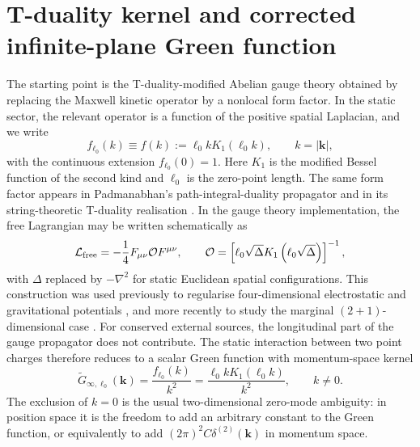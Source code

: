 \documentclass[openacc]{rsproca_new}%
\begin{document}
\section{T-duality kernel and corrected infinite-plane Green function}

The starting point is the T-duality-modified Abelian gauge theory obtained by replacing the Maxwell kinetic operator by a nonlocal form factor. In the static sector, the relevant operator is a function of the positive spatial Laplacian, and we write
\begin{equation}
  f_{\ell_0}(k)\equiv f(k):=\ell_0 k K_1(\ell_0 k),
  \qquad k=|\mathbf k|,
\end{equation}
with the continuous extension $f_{\ell_0}(0)=1$. Here $K_1$ is the modified Bessel function of the second kind and $\ell_0$ is the zero-point length. The same form factor appears in Padmanabhan's path-integral-duality propagator and in its string-theoretic T-duality realisation \cite{Padmanabhan1997, SmailagicSpallucciPadmanabhan2003, FontaniniSpallucciPadmanabhan2006}. In the gauge theory implementation, the free Lagrangian may be written schematically as
\begin{equation}
  \mathcal L_{\rm free}=-\frac{1}{4} F_{\mu\nu}\mathcal O F^{\mu\nu},\qquad
  \mathcal O=\left[\ell_0\sqrt{\Delta} K_1\left(\ell_0\sqrt{\Delta}\right)\right]^{-1},
\end{equation}
with $\Delta$ replaced by $-\nabla^2$ for static Euclidean spatial configurations. This construction was used previously to regularise four-dimensional electrostatic and gravitational potentials \cite{NicoliniSpallucciWondrak2019, GaeteNicolini2022}, and more recently to study the marginal $(2+1)$-dimensional case \cite{GaeteNicolini2026}. For conserved external sources, the longitudinal part of the gauge propagator does not contribute. The static interaction between two point charges therefore reduces to a scalar Green function with momentum-space kernel
\begin{equation}
  \widetilde G_{\infty,\ell_0}(\mathbf k)
  =\frac{f_{\ell_0}(k)}{k^2}
  =\frac{\ell_0 k K_1(\ell_0 k)}{k^2},
  \qquad k\neq 0.
\end{equation}
The exclusion of $k=0$ is the usual two-dimensional zero-mode ambiguity: in position space it is the freedom to add an arbitrary constant to the Green function, or equivalently to add $(2\pi)^2 C\delta^{(2)}(\mathbf k)$ in momentum space.
\end{document}
